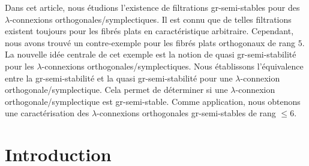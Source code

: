\documentclass[JEP,XML,SOM,Unicode,published]{cedram}
\theoremstyle{plain}
\theoremstyle{definition}
\begin{document}




\begin{altabstract}
Dans cet article, nous étudions l'existence de filtrations gr-semi-stables pour des $\lambda$\nobreakdash-con\-nexions orthogonales/symplectiques. Il est connu que de telles filtrations existent toujours pour les fibrés plats en caractéristique arbitraire. Cependant, nous avons trouvé un contre-exemple pour les fibrés plats orthogonaux de rang $5$. La nouvelle idée centrale de cet exemple est la notion de quasi gr-semi-stabilité pour les $\lambda$-connexions orthogonales/symplectiques. Nous établissons l'équivalence entre la gr-semi-stabilité et la quasi gr-semi-stabilité pour une $\lambda$-connexion orthogonale/symplectique. Cela permet de déterminer si une $\lambda$-connexion orthogonale/symplectique est gr-semi-stable. Comme application, nous obtenons une caractérisation des $\lambda$-connexions ortho\-go\-nales gr-semi-stables de rang $\leq 6$.
\end{altabstract}

\maketitle
\vspace*{-\baselineskip}
\tableofcontents

\mainmatter

\section{Introduction}
\end{document}
